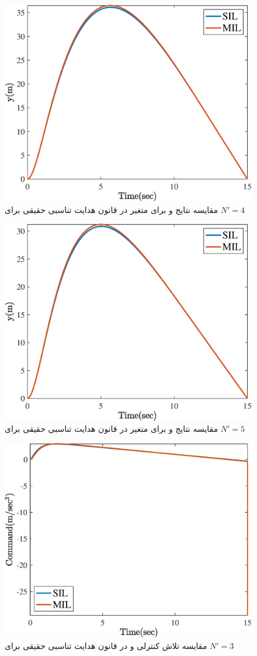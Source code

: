 \begin{figure}[H]
	\centering
	\includegraphics[width=.75\linewidth]{../Figure/Q2/d/y_2}
	\caption{مقایسه نتایج  و 
		برای متغیر
		در قانون هدایت تناسبی حقیقی برای
		$N'=4$}
\end{figure}

\begin{figure}[H]
	\centering
	\includegraphics[width=.75\linewidth]{../Figure/Q2/d/y_3}
	\caption{مقایسه نتایج  و 
		برای متغیر
		در قانون هدایت تناسبی حقیقی برای
		$N'=5$}
\end{figure}




\begin{figure}[H]
	\centering
	\includegraphics[width=.75\linewidth]{../Figure/Q2/d/command_1}
	\caption{مقایسه تلاش کنترلی  و 
		در قانون هدایت تناسبی حقیقی برای
		$N'=3$}
\end{figure}

